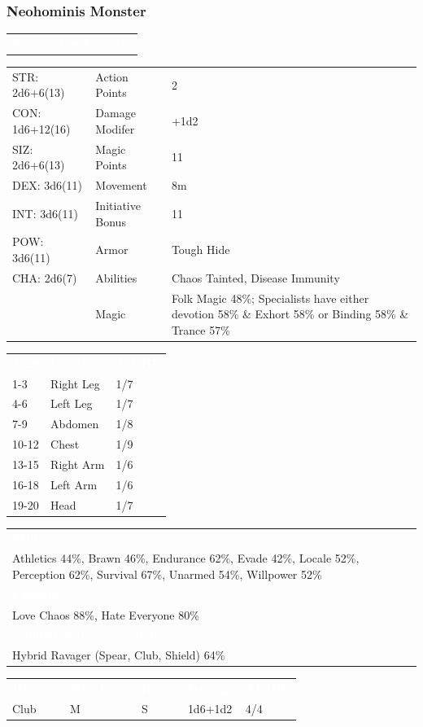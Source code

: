 \documentclass[letterpaper,serif]{rpg-module}
\begin{document}
\subsubsection{Neohominis Monster}

\lipsum[1]

\vspace{12pt}

\noindent\begin{tabularx}{\linewidth}{X}
\rowcolor{gray}
\textcolor{white}{\textbf{Neohominis Monster}}
\end{tabularx}
\begin{tabularx}{\linewidth}{XXX}
STR: 2d6+6(13) & Action Points & 2 \\
CON: 1d6+12(16) & Damage Modifer & +1d2 \\
SIZ: 2d6+6(13) & Magic Points & 11 \\
DEX: 3d6(11) & Movement & 8m \\
INT: 3d6(11) & Initiative Bonus & 11 \\
POW: 3d6(11) & Armor & Tough Hide \\
CHA: 2d6(7) & Abilities & Chaos Tainted, Disease Immunity \\
    & Magic & Folk Magic 48\%; Specialists have either devotion 58\% \& Exhort 58\% or Binding 58\% \& Trance 57\%
\end{tabularx}
\begin{tabularx}{\linewidth}{XXX}
\rowcolor{gray}
\textcolor{white}{\textbf{1d20}} & \textcolor{white}{\textbf{Location}} & \textcolor{white}{\textbf{AP/HP}} \\
1-3 & Right Leg & 1/7 \\
4-6 & Left Leg & 1/7 \\
7-9 & Abdomen & 1/8 \\
10-12 & Chest & 1/9 \\
13-15 & Right Arm & 1/6 \\
16-18 & Left Arm & 1/6 \\
19-20 & Head & 1/7 
\end{tabularx}
\begin{tabularx}{\linewidth}{X}
\rowcolor{gray}
\textcolor{white}{\textbf{Skills}} \\
Athletics 44\%, Brawn 46\%, Endurance 62\%, Evade 42\%, Locale 52\%, Perception 62\%, Survival 67\%, Unarmed 54\%, Willpower 52\%\\
\rowcolor{gray}
\textcolor{white}{\textbf{Passions}} \\
Love Chaos 88\%, Hate Everyone 80\% \\
\rowcolor{gray}
\textcolor{white}{\textbf{Combat Styles \& Weapons}} \\
Hybrid Ravager (Spear, Club, Shield) 64\%
\end{tabularx}
\begin{tabularx}{\linewidth}{XXXXX}
\rowcolor{gray}
\textcolor{white}{\textbf{Weapon}} & \textcolor{white}{\textbf{Size/Force}} & \textcolor{white}{\textbf{Reach}} & \textcolor{white}{\textbf{Damage}} & \textcolor{white}{\textbf{AP/HP}} \\
Club & M & S & 1d6+1d2 & 4/4
\end{tabularx}
\end{document}
